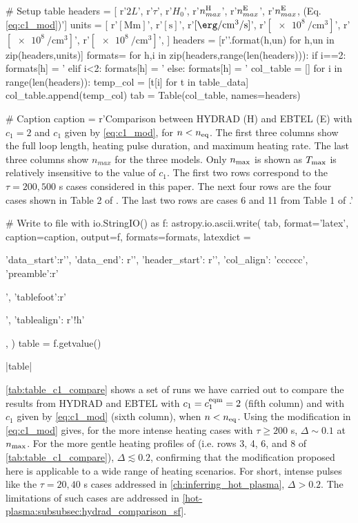 \begin{pycode}[chapter2]
# Setup table
headers = [
    r'$2L$',
    r'$\tau$',
    r'$H_0$',
    r'$n_{max}^\textup{H}$',
    r'$n_{max}^\textup{E}$',
    r'$n_{max}^\textup{E}$, (Eq. \ref{eq:c1_mod})']
units = [
    r'$[\si{\mega\m}]$',
    r'$[\si{\second}]$',
    r'$[\si{\erg\per\cubic\cm\per\second}]$',
    r'$[\SI{e8}{\per\cubic\cm}]$',
    r'$[\SI{e8}{\per\cubic\cm}]$',
    r'$[\SI{e8}{\per\cubic\cm}]$',
]
headers = [r'\thead{{{}\\{}}}'.format(h,un) for h,un in zip(headers,units)]
formats={}
for h,i in zip(headers,range(len(headers))):
    if i==2:
        formats[h] = '%
    elif i<2:
        formats[h] = '%
    else:
        formats[h] = '%
col_table = []
for i in range(len(headers)):
    temp_col = [t[i] for t in table_data]
    col_table.append(temp_col)
tab = Table(col_table, names=headers)

# Caption
caption = r'Comparison between HYDRAD (H) and EBTEL (E) with $c_1=2$ and $c_1$ given by \autoref{eq:c1_mod}, for $n<n_\textup{eq}$. The first three columns show the full loop length, heating pulse duration, and maximum heating rate. The last three columns show $n_{max}$ for the three models. Only $n_\textup{max}$ is shown as $T_\textup{max}$ is relatively insensitive to the value of $c_1$. The first two rows correspond to the $\tau=200,500$ s cases considered in this paper. The next four rows are the four cases shown in Table 2 of \citet{cargill_enthalpy-based_2012}. The last two rows are cases 6 and 11 from Table 1 of \citet{bradshaw_influence_2013}.\label{tab:table_c1_compare}'

# Write to file
with io.StringIO() as f:
    astropy.io.ascii.write(
        tab,
        format='latex',
        caption=caption,
        output=f,
        formats=formats,
        latexdict = {
            'data_start':r'\midrule', 'data_end': r'\bottomrule',
            'header_start': r'\toprule', 'col_align': 'cccccc',
            'preamble':r'\begin{center}', 'tablefoot':r'\end{center}',
            'tablealign': r'!h' },
    )
    table = f.getvalue()
\end{pycode}
\py[chapter2]|table|

\autoref{tab:table_c1_compare} shows a set of runs we have carried out to compare the results from HYDRAD and EBTEL with $c_1=c_1^\textup{eqm}=2$ (fifth column) and with $c_1$ given by \autoref{eq:c1_mod} (sixth column), when $n<n_\textup{eq}$. Using the modification in \autoref{eq:c1_mod} gives, for the more intense heating cases with $\tau\ge200$ s, $\Delta\sim0.1$ at $n_\textup{max}$. For the more gentle heating profiles of \citet{cargill_enthalpy-based_2012,bradshaw_influence_2013} (i.e. rows 3, 4, 6, and 8 of \autoref{tab:table_c1_compare}), $\Delta\lesssim0.2$, confirming that the modification proposed here is applicable to a wide range of heating scenarios. For short, intense pulses like the $\tau=20,40$ s cases addressed in \autoref{ch:inferring_hot_plasma}, $\Delta>0.2$. The limitations of such cases are addressed in \autoref{hot-plasma:subsubsec:hydrad_comparison_sf}.


